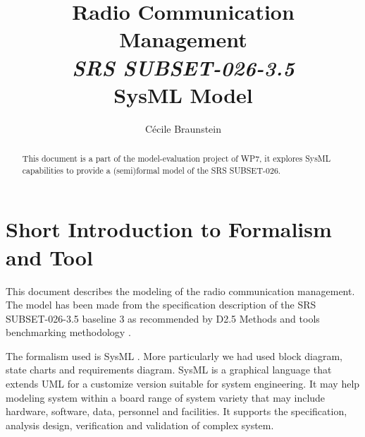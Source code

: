 \documentclass{openetcs_article}
\begin{document}
\frontmatter
{}





\author{C\'ecile Braunstein}


\title{Radio Communication Management \\
{\it SRS SUBSET-026-3.5} \\SysML Model}




\begin{abstract}
This document is a part of the model-evaluation project of WP7, it explores
SysML capabilities to provide a (semi)formal model of the SRS SUBSET-026.
\end{abstract}
\maketitle
\tableofcontents
\listoffiguresandtables
\newpage

\section{Short Introduction to Formalism and Tool}
\label{sec:short-intr-form}
This document describes the modeling  of the radio communication management. The
model has been made from the specification description of the SRS SUBSET-026-3.5
 baseline 3 as recommended by D2.5 Methods and tools benchmarking methodology
 \cite{D2-5}.


The formalism used  is SysML \cite{SysML}. More particularly we had used
block diagram, state charts and requirements diagram. 
SysML is a graphical language that extends UML for a customize version suitable
for system engineering. It may help modeling system within a board range of
system variety that may include hardware, software, data, personnel and
facilities. It supports the specification, analysis design, verification and
validation of complex system. 
\end{document}
